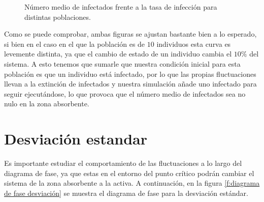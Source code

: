 \begin{figure}[H]
    \begin{center}
      \begin{subfigure}
          [Gillespie.]{
          \texttt{[image: 40 puntos 10\_100\_1000.png]}
          \label{f:gillespie diagrama fase}}
      \end{subfigure}
  
      \vspace{0.5cm}
      
      \begin{subfigure}
          [Langevin.]{
          \texttt{[image: xmedia vs lambda focker.png]}
          \label{f:focker diagrama fase}}
      \end{subfigure}
      
      \caption{Número medio de infectados frente a la tasa de infección para distintas poblaciones.}
      \label{f:diagrama de fase}  
    \end{center}    
\end{figure}



Como se puede comprobar, ambas figuras se ajustan bastante bien a lo esperado, si bien en el caso en el que la población es de $10$ individuos
esta curva es levemente distinta, ya que el cambio de estado de un individuo cambia el $10\%$ del sistema. A esto tenemos que 
sumarle que nuestra condición inicial para esta población es que un individuo está infectado, por lo que las propias fluctuaciones llevan 
a la extinción de infectados y nuestra simulación añade uno infectado para seguir ejecutándose, lo que provoca que el número medio de infectados
sea no nulo en la zona absorbente.

\section{Desviación estandar}

Es importante estudiar el comportamiento de las fluctuaciones a lo largo del diagrama de fase, ya que estas en el entorno del punto crítico 
podrán cambiar el sistema de la zona absorbente a la activa. A continuación, en la figura \ref{f:diagrama de fase desviación} se muestra el
diagrama de fase para la desviación estándar.

